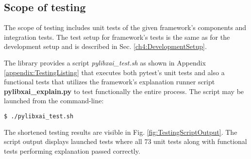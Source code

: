 \documentclass[
    bindingoffset=5mm,  %
    footnoteindent=3mm, %
    hyphenation=true    %
]{src/wut-thesis}
\begin{document}
\subsection{Scope of testing}

The scope of testing includes unit tests of the given framework's components and integration tests.
The test setup for framework's tests is the same as for the development setup and is described
in Sec. \ref{ch4:DevelopmentSetup}.

The library provides a script \emph{pylibxai\_test.sh} as shown in Appendix \ref{appendix:TestingListing} that
executes both pytest's unit tests and also a functional tests
that utilizes the framework's explanation runner script \textbf{pylibxai\_explain.py} to
test functionally the entire process. The script may be launched from the command-line:
\begin{verbatim}
$ ./pylibxai_test.sh
\end{verbatim}

The shortened testing results are visible in Fig. \ref{fig:TestingScriptOutput}.
The script output displays launched tests where all 73 unit tests along with functional
tests performing explanation passed correctly.
\end{document}
